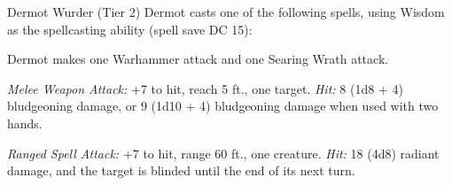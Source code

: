 \documentclass[10pt,a4paper,twoside,twocolumn,openany,nodeprecatedcode]{dndbook}
\begin{document}
\begin{DndMonster}[float=ht]{Dermot Wurder (Tier 2)}
\DndMonsterBasics[
armor-class = {19 (splint mail)},
hit-points = {\DndDice{15d6 + 30}},
speed = {30 ft.}
]
\DndMonsterAbilityScores[
 str = 18,
 dex = 12,
 con = 14,
 int = 10,
 wis = 18,
 cha = 10
]
\DndMonsterDetails[
saving-throws = {Wis +7, Cha +3},
skills = {Medicine +7, Religion +3, Survival +7},
senses = {darkvision 60 ft., passive perception 14},
languages = {Common, Goblin, Orc},
challenge = 5,
]
Dermot casts one of the following spells, using Wisdom as the spellcasting ability (spell save DC 15):
\begin{DndMonsterSpells}
\end{DndMonsterSpells}
\par
{}
Dermot makes one Warhammer attack and one Searing Wrath attack.

\textsl{Melee Weapon Attack:} +7 to hit, reach 5 ft., one target. \textsl{Hit:} 8 (1d8 + 4) bludgeoning damage, or 9 (1d10 + 4) bludgeoning damage when used with two hands.

\textsl{Ranged Spell Attack:} +7 to hit, range 60 ft., one creature. \textsl{Hit:} 18 (4d8) radiant damage, and the target is blinded until the end of its next turn.

\end{DndMonster}


\clearpage
{}
\end{document}
